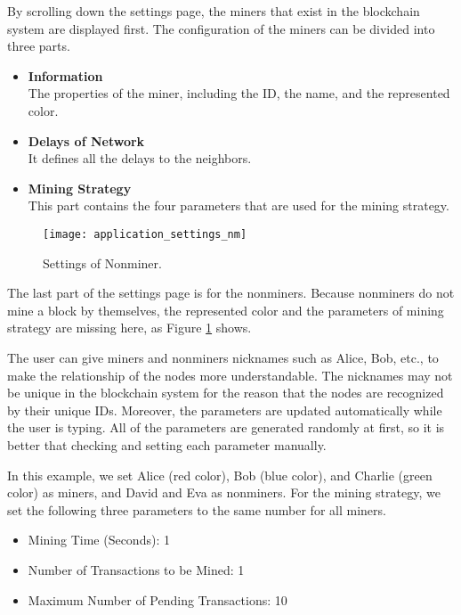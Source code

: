 By scrolling down the settings page, the miners that exist in the blockchain system are displayed first. The configuration of the miners can be divided into three parts.

\begin{itemize}
    \item \textbf{Information} \\
        The properties of the miner, including the ID, the name, and the represented color.
    \item \textbf{Delays of Network} \\
        It defines all the delays to the neighbors.
    \item \textbf{Mining Strategy} \\
        This part contains the four parameters that are used for the mining strategy.
\end{itemize}

\begin{figure}[htb]
    \centering
    \texttt{[image: application\_settings\_nm]}
    \caption{Settings of Nonminer.}
    \label{fig:settings of nonminer}
\end{figure}

The last part of the settings page is for the nonminers. Because nonminers do not mine a block by themselves, the represented color and the parameters of mining strategy are missing here, as Figure \ref{fig:settings of nonminer} shows.

The user can give miners and nonminers nicknames such as Alice, Bob, etc., to make the relationship of the nodes more understandable. The nicknames may not be unique in the blockchain system for the reason that the nodes are recognized by their unique IDs. Moreover, the parameters are updated automatically while the user is typing. All of the parameters are generated randomly at first, so it is better that checking and setting each parameter manually.

In this example, we set Alice (red color), Bob (blue color), and Charlie (green color) as miners, and David and Eva as nonminers. For the mining strategy, we set the following three parameters to the same number for all miners.

\begin{itemize}
    \item Mining Time (Seconds): 1
    \item Number of Transactions to be Mined: 1
    \item Maximum Number of Pending Transactions: 10
\end{itemize}


